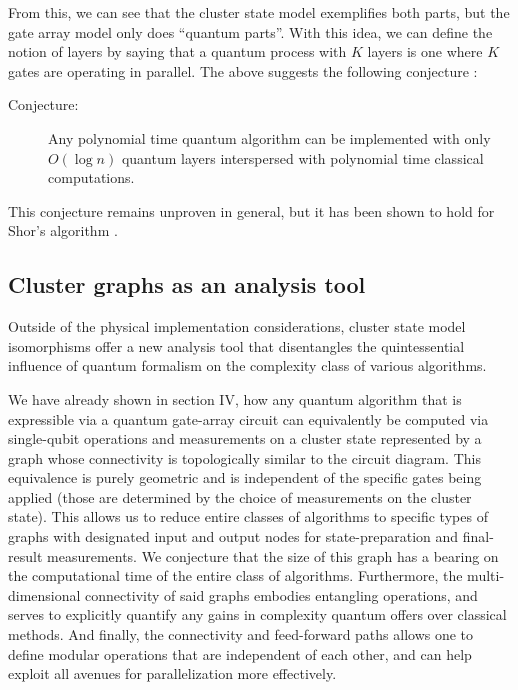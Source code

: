 \documentclass[twocolumn]{Styles/IEEEtran11}
\begin{document}
From this, we can see that the cluster state model exemplifies both parts, but the gate array model only does ``quantum parts''. With this idea, we can define the notion of layers by saying that a quantum process with $K$ layers is one where $K$ gates are operating in parallel. The above suggests the following conjecture \cite{jozsa2006introduction}:

\begin{description}
\item[Conjecture:] Any polynomial time quantum algorithm can be implemented with only $O(\log n)$ quantum layers interspersed with polynomial time classical computations.
\end{description}


This conjecture remains unproven in general, but it has been shown to hold for Shor's algorithm \cite{cleve2000fast}.


\subsection{Cluster graphs as an analysis tool}

Outside of the physical implementation considerations, cluster state model isomorphisms offer a new analysis tool that disentangles the quintessential influence of quantum formalism on the complexity class of various algorithms.

We have already shown in section IV, how any quantum algorithm that is expressible via a quantum gate-array circuit can equivalently be computed via single-qubit operations and measurements on a cluster state represented by a graph whose connectivity is topologically similar to the circuit diagram. This equivalence is purely geometric and is independent of the specific gates being applied (those are determined by the choice of measurements on the cluster state). This allows us to reduce entire classes of algorithms to specific types of graphs with designated input and output nodes for state-preparation and final-result measurements. We conjecture that the size of this graph has a bearing on the computational time of the entire class of algorithms. Furthermore, the multi-dimensional connectivity of said graphs embodies entangling operations, and serves to explicitly quantify any gains in complexity quantum offers over classical methods. And finally, the connectivity and feed-forward paths allows one to define modular operations that are independent of each other, and can help exploit all avenues for parallelization more effectively.
\end{document}
